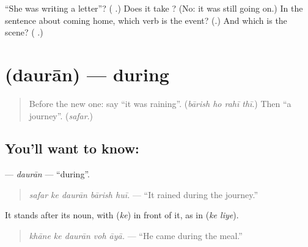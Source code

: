 \begin{tcolorbox}[breakable,colback=teal!4,colframe=teal!35!black,title={Before you move on}]
\textquotedblleft{}She was writing a letter\textquotedblright{}? (\textbf{    }.) Does it take \textbf{}? (No: it was still going on.) In the sentence about coming home, which verb is the event? (\textbf{}.) And which is the scene? (\textbf{  }.)
\end{tcolorbox}
\section[\texorpdfstring{\ur{دوران} (daurān)}{دوران (daurān)}]{ (daurān) — during}

\label{lesson:UR-C266-dauran}



\begin{quote}
Before the new one: say \textquotedblleft{}it was raining\textquotedblright{}. (\emph{bārish ho rahī thī}.) Then \textquotedblleft{}a journey\textquotedblright{}. (\emph{safar}.)
\end{quote}

\subsection*{You'll want to know: }
\textbf{} — \emph{daurān} — \textquotedblleft{}during\textquotedblright{}.

\begin{quote}
\textbf{    }
\end{quote}

\begin{quote}
\emph{safar ke daurān bārish huī.} — \textquotedblleft{}It rained during the journey.\textquotedblright{}
\end{quote}

It stands after its noun, with \textbf{} (\emph{ke}) in front of it, as in \textbf{ } (\emph{ke liye}).

\begin{quote}
\textbf{    }
\end{quote}

\begin{quote}
\emph{khāne ke daurān voh āyā.} — \textquotedblleft{}He came during the meal.\textquotedblright{}
\end{quote}

